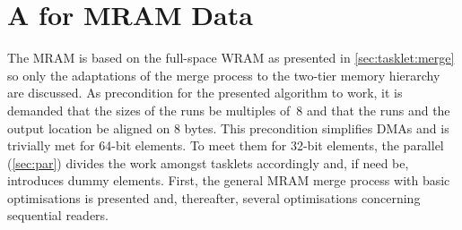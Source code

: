 \section{A \texorpdfstring{\MS{}}{MergeSort} for MRAM Data}
\label{sec:mram:merge}

The MRAM \MS{} is based on the full-space WRAM \MS{} as presented in \cref{sec:tasklet:merge} so only the adaptations of the merge process to the two-tier memory hierarchy are discussed.
As precondition for the presented algorithm to work, it is demanded that the sizes of the runs be multiples of~8 and that the runs and the output location be aligned on 8 bytes.
This precondition simplifies DMAs and is trivially met for 64-bit elements.
To meet them for 32-bit elements, the parallel \MS{} (\cref{sec:par}) divides the work amongst tasklets accordingly and, if need be, introduces dummy elements.
First, the general MRAM merge process with basic optimisations is presented and, thereafter, several optimisations concerning sequential readers.






